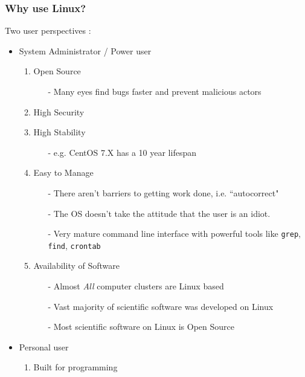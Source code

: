 \documentclass{beamer}
\newcommand{\code}[1]{\colorbox{codegray}{\texttt{#1}}}
\begin{document}
\begin{frame}
\frametitle{Why use Linux?}
Two user perspectives : 
\begin{itemize}
    \item System Administrator / Power user
    \begin{enumerate}
        \item Open Source 
        \begin{itemize}
            \item[-] Many eyes find bugs faster and prevent malicious actors
        \end{itemize}
        \pause
        \item High Security 
        \pause
        \item High Stability
        \begin{itemize}
            \item[-] e.g. CentOS 7.X has a 10 year lifespan
        \end{itemize}
        \pause
        \item Easy to Manage
        \begin{itemize}
            \item[-] There aren't barriers to getting work done, i.e. ``autocorrect"
            \pause
            \item[-] The OS doesn't take the attitude that the user is an idiot.
            \pause
            \item[-] Very mature command line interface with powerful tools like \code{grep}, \code{find}, \code{crontab}
        \end{itemize}
        \pause
        \item Availability of Software
        \begin{itemize}
            \item[-] Almost \emph{All} computer clusters are Linux based
            \pause
            \item[-] Vast majority of scientific software was developed on Linux 
            \pause
            \item[-] Most scientific software on Linux is Open Source 
        \end{itemize}
    \end{enumerate}
    \pause
    \item Personal user
    \begin{enumerate}
        \item Built for programming
        \begin{itemize}

\end{itemize}
\end{enumerate}
\end{itemize}
\end{frame}
\end{document}
